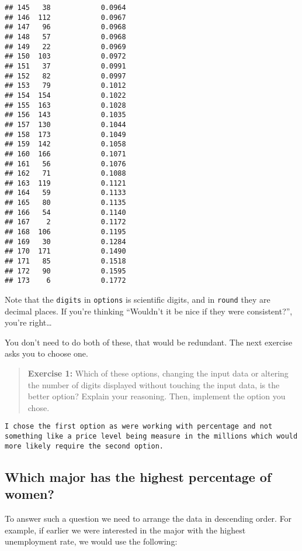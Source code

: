\documentclass[
]{article}
\begin{document}
\begin{verbatim}
## 145   38            0.0964
## 146  112            0.0967
## 147   96            0.0968
## 148   57            0.0968
## 149   22            0.0969
## 150  103            0.0972
## 151   37            0.0991
## 152   82            0.0997
## 153   79            0.1012
## 154  154            0.1022
## 155  163            0.1028
## 156  143            0.1035
## 157  130            0.1044
## 158  173            0.1049
## 159  142            0.1058
## 160  166            0.1071
## 161   56            0.1076
## 162   71            0.1088
## 163  119            0.1121
## 164   59            0.1133
## 165   80            0.1135
## 166   54            0.1140
## 167    2            0.1172
## 168  106            0.1195
## 169   30            0.1284
## 170  171            0.1490
## 171   85            0.1518
## 172   90            0.1595
## 173    6            0.1772
\end{verbatim}

Note that the \texttt{digits} in \texttt{options} is scientific digits,
and in \texttt{round} they are decimal places. If you're thinking
``Wouldn't it be nice if they were consistent?'', you're right\ldots{}

You don't need to do both of these, that would be redundant. The next
exercise asks you to choose one.

\begin{quote}
\textbf{Exercise 1: } Which of these options, changing the input data or
altering the number of digits displayed without touching the input data,
is the better option? Explain your reasoning. Then, implement the option
you chose.
\end{quote}

\begin{verbatim}
I chose the first option as were working with percentage and not something like a price level being measure in the millions which would more likely require the second option.
\end{verbatim}

\hypertarget{which-major-has-the-highest-percentage-of-women}{%
\subsection{Which major has the highest percentage of
women?}\label{which-major-has-the-highest-percentage-of-women}}

To answer such a question we need to arrange the data in descending
order. For example, if earlier we were interested in the major with the
highest unemployment rate, we would use the following:
\end{document}
